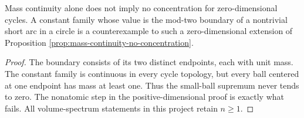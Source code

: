 \begin{example}\label{ex:zero-cycle-concentration}
Mass continuity alone does not imply no concentration for zero-dimensional cycles. A constant family whose value is the mod-two boundary of a nontrivial short arc in a circle is a counterexample to such a zero-dimensional extension of Proposition \ref{prop:mass-continuity-no-concentration}.
\end{example}
\begin{proof}
The boundary consists of its two distinct endpoints, each with unit mass. The constant family is continuous in every cycle topology, but every ball centered at one endpoint has mass at least one. Thus the small-ball supremum never tends to zero. The nonatomic step in the positive-dimensional proof is exactly what fails. All volume-spectrum statements in this project retain $n\geq1$.
\end{proof}
